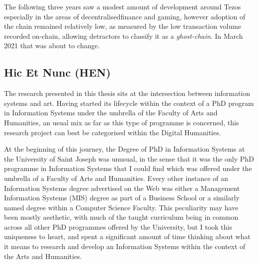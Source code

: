 The following three years saw a modest amount of development around Tezos especially in the areas of \gls{decentralisedfinance} and gaming, however adoption of the chain remained relatively low, as measured by the low transaction volume recorded on-chain, allowing detractors to classify it as a \emph{\gls{ghost-chain}}. In March 2021 that was about to change.





\subsection{Hic Et Nunc (HEN)}




























The research presented in this thesis sits at the intersection between information systems and art. Having started its lifecycle within the context of a PhD program in Information Systems under the umbrella of the Faculty of Arts and Humanities, an usual mix as far as this type of programme is concerned, this research project can best be categorised within the Digital Humanities. 

At the beginning of this journey, the Degree of PhD in Information Systems at the University of Saint Joseph was unusual, in the sense that it was the only PhD programme in Information Systems that I could find which was offered under the umbrella of a Faculty of Arts and Humanities. Every other instance of an Information Systems degree advertised on the Web was either a Management Information Systems (MIS) degree as part of a Business School or a similarly named degree within a Computer Science Faculty. This peculiarity may have been mostly aesthetic, with much of the taught curriculum being in common across all other PhD programmes offered by the University, but I took this uniqueness to heart, and spent a significant amount of time thinking about what it means to research and develop an Information Systems within the context of the Arts and Humanities.

